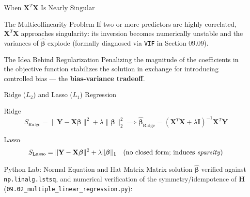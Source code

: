 \documentclass[10pt, aspectratio=169]{beamer}
\begin{document}
\begin{frame}{When $\mathbf{X}^T\mathbf{X}$ Is Nearly Singular}
  \footnotesize
  \begin{block}{The Multicollinearity Problem}
    If two or more predictors are highly correlated, $\mathbf{X}^T\mathbf{X}$ approaches singularity: its inversion becomes numerically unstable and the variances of $\hat{\boldsymbol\beta}$ explode (formally diagnosed via \texttt{VIF} in Section 09.09).
  \end{block}
  \pause

  \vspace{0.1cm}
  \begin{alertblock}{The Idea Behind Regularization}
    Penalizing the magnitude of the coefficients in the objective function stabilizes the solution in exchange for introducing controlled bias --- the \textbf{bias-variance tradeoff}.
  \end{alertblock}
\end{frame}

\begin{frame}{Ridge ($L_2$) and Lasso ($L_1$) Regression}
  \footnotesize
  \begin{block}{Ridge}
    $$S_{\text{Ridge}}=\|\mathbf{Y}-\mathbf{X}\boldsymbol\beta\|^2+\lambda\|\boldsymbol\beta\|_2^2 \implies \hat{\boldsymbol\beta}_{\text{Ridge}}=(\mathbf{X}^T\mathbf{X}+\lambda\mathbf{I})^{-1}\mathbf{X}^T\mathbf{Y}$$
  \end{block}
  \pause

  \vspace{0.1cm}
  \begin{alertblock}{Lasso}
    $$S_{\text{Lasso}}=\|\mathbf{Y}-\mathbf{X}\boldsymbol\beta\|^2+\lambda\|\boldsymbol\beta\|_1 \quad \text{(no closed form; induces \emph{sparsity})}$$
  \end{alertblock}
\end{frame}

\begin{frame}[fragile]{Python Lab: Normal Equation and Hat Matrix}
  \scriptsize
  Matrix solution $\hat{\boldsymbol\beta}$ verified against \texttt{np.linalg.lstsq}, and numerical verification of the symmetry/idempotence of $\mathbf{H}$ (\texttt{09.02\_multiple\_linear\_regression.py}):
  {
  }
\end{frame}
\end{document}
